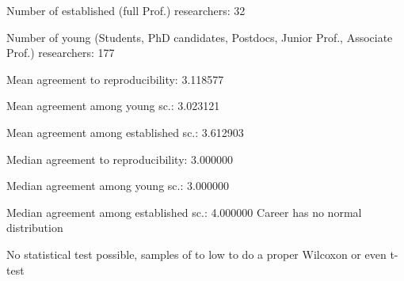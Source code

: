Number of established (full Prof.) researchers: 32

Number of young (Students, PhD candidates, Postdocs, Junior Prof., Associate Prof.) researchers: 177

Mean agreement to reproducibility: 3.118577

Mean agreement among young sc.: 3.023121

Mean agreement among established sc.: 3.612903

Median agreement to reproducibility: 3.000000

Median agreement among young sc.: 3.000000

Median agreement among established sc.: 4.000000
Career has no normal distribution

No statistical test possible, samples of to low to do a proper Wilcoxon or even t-test
